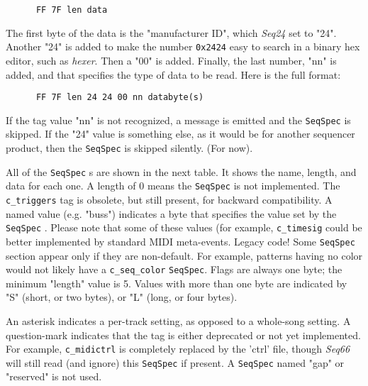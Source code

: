    \begin{verbatim}
      FF 7F len data
   \end{verbatim}

   The first byte of the data is the "manufacturer ID", which \textsl{Seq24}
   set to "24". Another "24" is added to make the number \texttt{0x2424}
   easy to search in a binary hex editor, such as \textsl{hexer}.
   Then a "00" is added.  Finally, the last number, "nn" is added, and that
   specifies the type of data to be read.  Here is the full format:

   \begin{verbatim}
      FF 7F len 24 24 00 nn databyte(s)
   \end{verbatim}

   If the tag value "nn" is not recognized, a message is emitted and the
  \texttt{SeqSpec} is skipped.  If the "24" value is something else, as it
  would be for another sequencer product, then the
   \texttt{SeqSpec} is skipped silently. (For now).

   All of the
   \texttt{SeqSpec} s are shown in the next table. It shows the name, length,
   and data for each one. A length of 0 means the
   \texttt{SeqSpec} is not implemented.
   The \texttt{c\_triggers} tag is obsolete, but still present, for
   backward compatibility.
   A named value (e.g. "buss") indicates a byte that specifies the value set by
   the \texttt{SeqSpec} .
   Please note that some of these values (for example, \texttt{c\_timesig}
   could be better implemented by standard MIDI meta-events. Legacy code!
   Some \texttt{SeqSpec} section appear only if they are non-default.
   For example, patterns having no color would not likely have a
   \texttt{c\_seq\_color} \texttt{SeqSpec}.
   Flags are always one byte; the minimum "length" value is 5.
   Values with more than one byte are indicated by "S" (short, or two bytes),
   or "L" (long, or four bytes).

   An asterisk indicates a per-track setting, as
   opposed to a whole-song setting. A question-mark indicates that the tag is
   either deprecated or not yet implemented.
   For example, \texttt{c\_midictrl} is completely replaced by the
   'ctrl' file, though \textsl{Seq66} will still read (and ignore)
   this \texttt{SeqSpec} if present.
   A \texttt{SeqSpec} named "gap" or "reserved" is not used.

